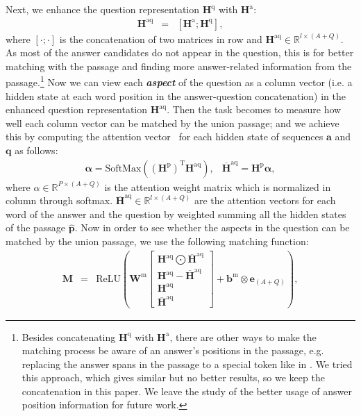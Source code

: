 \documentclass{article} \usepackage{iclr2018_conference,times}
\begin{document}
Next, we enhance the question representation $\mathbf{H}^{\text{q}}$ with $\mathbf{H}^{\text{a}}$:
\begin{eqnarray}
\mathbf{H}^{\text{aq}} &=& [\mathbf{H}^{\text{a}};\mathbf{H}^{\text{q}}], 
\label{eqn:aspects}
\end{eqnarray}
where $[\cdot; \cdot]$ is the concatenation of two matrices in row and $\mathbf{H}^{\text{aq}}\in \mathbb{R}^{l\times (A+Q)}$. As most of the answer candidates do not appear in the question, this is for better matching with the passage and finding more answer-related information from the passage.\footnote{Besides concatenating $\mathbf{H}^{\text{q}}$ with $\mathbf{H}^{\text{a}}$, there are other ways to make the matching process be aware of an answer's positions in the passage, e.g. replacing the answer spans in the passage to a special token like in \cite{yih-EtAl:2015:ACL-IJCNLP}. We tried this approach, which gives similar but no better results, so we keep the concatenation in this paper. We leave the study of the better usage of answer position information for future work.}
Now we can view each \textbf{\emph{aspect}} of the question as a column vector (i.e. a hidden state at each word position in the answer-question concatenation) in the enhanced question representation $\mathbf{H}^{\text{aq}}$. Then the task becomes to measure how well each column vector can be matched by the union passage; and we achieve this by computing the attention vector~\cite{parikh2016decomposable} for each hidden state of sequences $\mathbf{a}$ and $\mathbf{q}$ as follows:
\begin{equation}
\begin{matrix}
\mathbf{\alpha}  =  \text{SoftMax}\left( ( \mathbf{H}^{\text{p}})^\text{T} \mathbf{H}^{\text{aq}} \right), &
\overline{\mathbf{H}}^{\text{aq}}  =  \mathbf{H}^{\text{p}}\mathbf{\alpha},
\label{eqn:alpha}
\end{matrix}
\end{equation}
where $\alpha \in \mathbb{R}^{P\times (A+Q)}$ is the attention weight matrix which is normalized in column through softmax. $\overline{\mathbf{H}}^{\text{aq}}\in \mathbb{R}^{l \times (A+Q)}$ are the attention vectors for each word of the answer and the question by weighted summing all the hidden states of the passage $\mathbf{\hat{p}}$. Now in order to see whether the aspects in the question can be matched by the union passage, we use the following matching function:
\begin{eqnarray}
\mathbf{M} & = & \text{ReLU}\left(  \mathbf{W}^\text{m} \begin{bmatrix}
 \mathbf{H}^{\text{aq}} \bigodot \overline{\mathbf{H}}^{\text{aq}}
\\ 
\mathbf{H}^{\text{aq}} - \overline{\mathbf{H}}^{\text{aq}}
\\
\mathbf{H}^{\text{aq}}
\\ 
\overline{\mathbf{H}}^{\text{aq}}
\end{bmatrix} + \mathbf{b}^\text{m}\otimes \mathbf{e}_{(A+Q)} \right),
\label{eqn:match}
\end{eqnarray}
\end{document}
